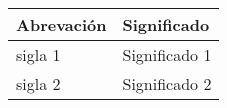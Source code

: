 
\begin{center}
	\begin{tabular}{|l|p{85mm}|}
		\hline
		\textbf{Abrevación}	& \textbf{Significado}\\
		\hline\hline
		sigla 1			& Significado 1\\	\hline
		sigla 2			& Significado 2\\ \hline
		\end{tabular}
\end{center}
